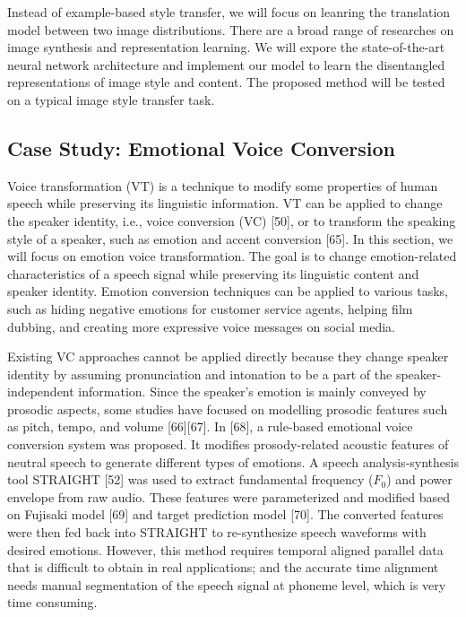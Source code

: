 \documentclass{article}
\begin{document}
Instead of example-based style transfer, we will focus on leanring the translation model between two image distributions. There are a broad range of researches on image synthesis and representation learning. We will expore the state-of-the-art neural network architecture and implement our model to learn the disentangled representations of image style and content. The proposed method will be tested on a typical image style transfer task.


\subsection{Case Study: Emotional Voice Conversion}
Voice transformation (VT) is a technique to modify some properties of human speech while preserving its linguistic information. VT can be applied to change the speaker identity, i.e., voice conversion (VC) [50], or to transform the speaking style of a speaker, such as emotion and accent conversion [65]. In this section, we will focus on emotion voice transformation. The goal is to change emotion-related characteristics of a speech signal while preserving its linguistic content and speaker identity. Emotion conversion techniques can be applied to various tasks, such as hiding negative emotions for customer service agents, helping film dubbing, and creating more expressive voice messages on social media.

Existing VC approaches cannot be applied directly because they change speaker identity by assuming pronunciation and intonation to be a part of the speaker-independent information. Since the speaker's emotion is mainly conveyed by prosodic aspects, some studies have focused on modelling prosodic features such as pitch, tempo, and volume [66][67]. In [68], a rule-based emotional voice conversion system was proposed. It modifies prosody-related acoustic features of neutral speech to generate different types of emotions. A speech analysis-synthesis tool STRAIGHT [52] was used to extract fundamental frequency ($F_0$) and power envelope from raw audio. These features were parameterized and modified based on Fujisaki model [69] and target prediction model [70]. The converted features were then fed back into STRAIGHT to re-synthesize speech waveforms with desired emotions. However, this method requires temporal aligned parallel data that is difficult to obtain in real applications; and the accurate time alignment needs manual segmentation of the speech signal at phoneme level, which is very time consuming.
\end{document}
